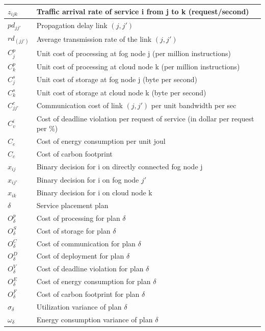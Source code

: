 \documentclass[twocolumn]{article}
\begin{document}
\begin{supertabular}{|p{1.3cm}p{5.8cm}|}
	$z_{ijk}$&Traffic arrival rate of service i from j to k (request/second)\\
\hline
    $pd_{jj'}$&Propagation delay link $(j,j')$\\
    $rd_(jj')$&Average transmission rate of the link $(j,j')$\\
\hline
    $C_{j}^{p}$&Unit cost of processing at fog node j (per million instructions)\\
	$C_{k}^{p}$&Unit cost of processing at cloud node k (per million instructions)\\
	$C_{j}^{s}$&Unit cost of storage at fog node j (byte per second)\\
	$C_{k}^{s}$&Unit cost of storage at cloud node k (byte per second)\\
	$C_{jj'}^{c}$&Communication cost of link $(j,j')$ per unit bandwidth per sec\\    
	$C_{v}^{i}$&Cost of deadline violation per request of service (in dollar per request per \%)\\
	$C_{e}$&Cost of energy consumption per unit joul\\	
	$C_{c}$&Cost of carbon footprint\\
\hline
	$x_{ij}$&Binary decision for i on directly connected fog node j\\
    $x_{ij'}$&Binary decision for i on fog node $j'$\\
    $x_{ik}$&Binary decision for i on cloud node k\\
\hline
	$\delta$&Service placement plan\\
    $O_{\delta}^{p}$&Cost of processing for plan $\delta$\\
    $O_{\delta}^{S}$&Cost of storage for plan $\delta$\\
    $O_{\delta}^{C}$&Cost of communication for plan $\delta$\\
    $O_{\delta}^{D}$&Cost of deployment for plan $\delta$\\
    $O_{\delta}^{V}$&Cost of deadline violation for plan $\delta$\\
    $O_{\delta}^{E}$&Cost of energy consumption for plan $\delta$\\
    $O_{\delta}^{F}$&Cost of carbon footprint for plan $\delta$\\
    $\sigma_{\delta}$&Utilization variance of plan $\delta$\\
    $\omega_{\delta}$&Energy consumption variance of plan $\delta$\\
\hline
\end{supertabular}
\normalsize
\end{document}
